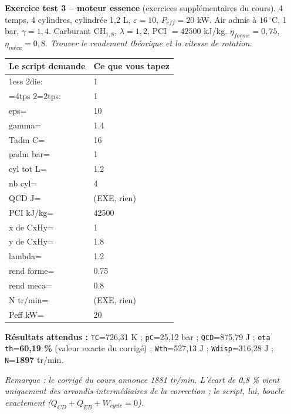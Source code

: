 \documentclass[10.5pt,a4paper]{article}
\makeatletter
\newenvironment{saisie}{%
\begin{center}\small
\begin{tabular}{@{}>{\ttfamily}l l@{}}
\toprule
\textrm{\textbf{Le script demande}} & \textbf{Ce que vous tapez} \\
\midrule
}{%
\bottomrule
\end{tabular}
\end{center}
}
\makeatother
\begin{document}
\begin{test}
\textbf{Exercice test 3 -- moteur essence} (exercices supplémentaires du cours). 4 temps, 4 cylindres,
cylindrée 1,2 L, $\varepsilon=10$, $P_{eff}=20$ kW. Air admis à $16\,^\circ$C, 1 bar, $\gamma=1{,}4$.
Carburant CH$_{1,8}$, $\lambda=1{,}2$, PCI $=42500$ kJ/kg. $\eta_{forme}=0{,}75$, $\eta_{méca}=0{,}8$.
\emph{Trouver le rendement théorique et la vitesse de rotation.}

\begin{saisie}
1ess 2die: & 1 \\
1=4tps 2=2tps: & 1 \\
eps= & 10 \\
gamma= & 1.4 \\
Tadm C= & 16 \\
padm bar= & 1 \\
cyl tot L= & 1.2 \\
nb cyl= & 4 \\
QCD J= & \textrm{(EXE, rien)} \\
PCI kJ/kg= & 42500 \\
x de CxHy= & 1 \\
y de CxHy= & 1.8 \\
lambda= & 1.2 \\
rend forme= & 0.75 \\
rend meca= & 0.8 \\
N tr/min= & \textrm{(EXE, rien)} \\
Peff kW= & 20 \\
\end{saisie}

\textbf{Résultats attendus :} \texttt{TC}=726,31 K ; \texttt{pC}=25,12 bar ; \texttt{QCD}=875,79 J ;
\texttt{eta th}=\textbf{60,19 \%} (valeur exacte du corrigé) ; \texttt{Wth}=527,13 J ;
\texttt{Wdisp}=316,28 J ; \texttt{N}=\textbf{1897} tr/min.

\emph{Remarque : le corrigé du cours annonce 1881 tr/min. L'écart de 0,8 \% vient uniquement des
arrondis intermédiaires de la correction ; le script, lui, boucle exactement
($Q_{CD}+Q_{EB}+W_{cycle}=0$).}
\end{test}
\end{document}
